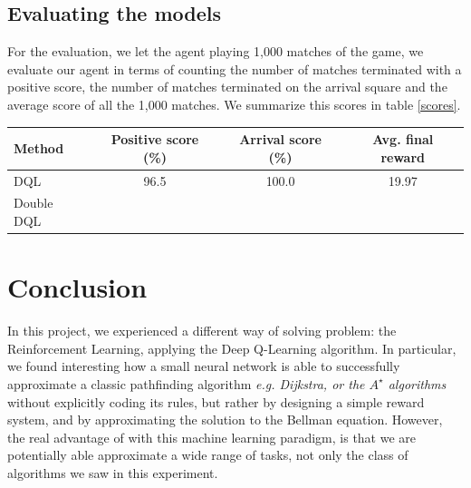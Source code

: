 \documentclass{article}
\begin{document}
\subsection{Evaluating the models}

For the evaluation, we let the agent playing 1,000 matches of the game, we evaluate our agent in terms of counting the number of matches terminated with a positive score, the number of matches terminated on the arrival square and the average score of all the 1,000 matches. We summarize this scores in table \ref{scores}.

\begin{center}
	\label{scores}
	\begin{tabular}{ |l|c|c|c| } 
		\hline
		Method & Positive score (\%) & Arrival score (\%) & Avg. final reward \\ 
		\hline
		DQL & 96.5 & 100.0 & 19.97\\ 
		Double DQL  &  &  &\\ 
		\hline
	\end{tabular}
\end{center}

\section{Conclusion}
In this project, we experienced a different way of solving problem: the Reinforcement Learning, applying the Deep Q-Learning algorithm. In particular, we found interesting how a small neural network is able to successfully approximate a classic pathfinding algorithm \textit{e.g. Dijkstra, or the $A^\star$ algorithms} without explicitly coding its rules, but rather by designing a simple reward system, and by approximating the solution to the Bellman equation. However, the real advantage of with this machine learning paradigm, is that we are potentially able approximate a wide range of tasks, not only the class of algorithms we saw in this experiment. 



\end{document}
